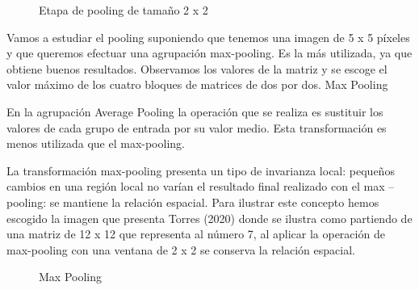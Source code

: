 \documentclass[
  a4paper,
  DIV=11,
  numbers=noendperiod]{scrreprt}
\begin{document}
\begin{figure}


\caption{\label{fig-pooling}Etapa de pooling de tamaño 2 x 2}

\end{figure}%

Vamos a estudiar el pooling suponiendo que tenemos una imagen de 5 x 5
píxeles y que queremos efectuar una agrupación max-pooling. Es la más
utilizada, ya que obtiene buenos resultados. Observamos los valores de
la matriz y se escoge el valor máximo de los cuatro bloques de matrices
de dos por dos. Max Pooling

En la agrupación Average Pooling la operación que se realiza es
sustituir los valores de cada grupo de entrada por su valor medio. Esta
transformación es menos utilizada que el max-pooling.

La transformación max-pooling presenta un tipo de invarianza local:
pequeños cambios en una región local no varían el resultado final
realizado con el max -- pooling: se mantiene la relación espacial. Para
ilustrar este concepto hemos escogido la imagen que presenta Torres
(2020) donde se ilustra como partiendo de una matriz de 12 x 12 que
representa al número 7, al aplicar la operación de max-pooling con una
ventana de 2 x 2 se conserva la relación espacial.

\begin{figure}


\caption{\label{fig-max-pooling}Max Pooling}

\end{figure}%
\end{document}
